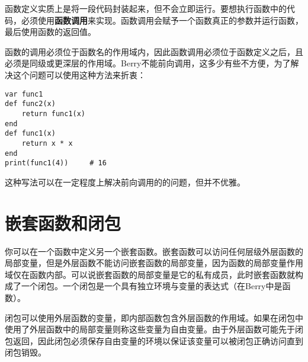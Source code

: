 函数定义实质上是将一段代码封装起来，但不会立即运行。要想执行函数中的代码，必须使用\textbf{函数调用}来实现。函数调用会赋予一个函数真正的参数并运行函数，最后使用函数的返回值。

函数的调用必须位于函数名的作用域内，因此函数调用必须位于函数定义之后，且必须是同级或更深层的作用域。Berry不能前向调用，这多少有些不方便，为了解决这个问题可以使用这种方法来折衷：
\begin{lstlisting}[language=berry, numbers=none]
var func1
def func2(x)
    return func1(x)
end
def func1(x)
    return x * x
end
print(func1(4))     # 16
\end{lstlisting}
这种写法可以在一定程度上解决前向调用的的问题，但并不优雅。

\section{嵌套函数和闭包}

你可以在一个函数中定义另一个嵌套函数。嵌套函数可以访问任何层级外层函数的局部变量，但是外层函数不能访问嵌套函数的局部变量，因为函数的局部变量作用域仅在函数内部。可以说嵌套函数的局部变量是它的私有成员，此时嵌套函数就构成了一个闭包。一个闭包是一个具有独立环境与变量的表达式（在Berry中是函数）。

闭包可以使用外层函数的变量，即内部函数包含外层函数的作用域。如果在闭包中使用了外层函数中的局部变量则称这些变量为自由变量。由于外层函数可能先于闭包返回，因此闭包必须保存自由变量的环境以保证该变量可以被闭包正确访问直到闭包销毁。
